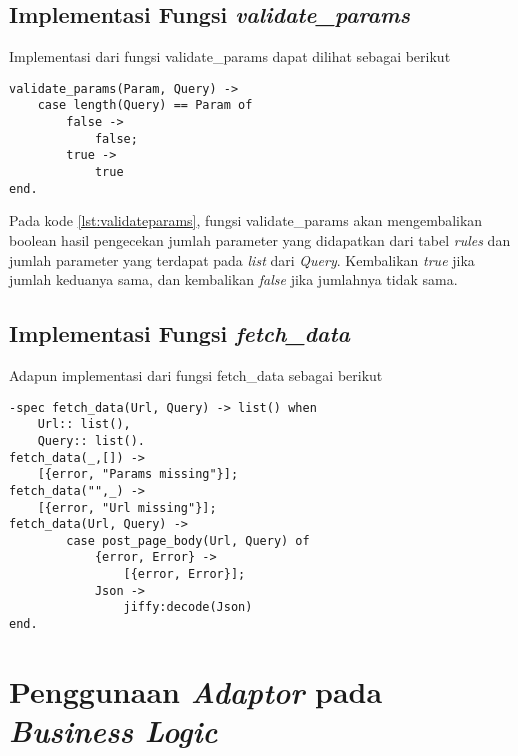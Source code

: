 \subsection{Implementasi Fungsi \textit{validate\_params}}

Implementasi dari fungsi validate\_params dapat dilihat sebagai berikut
\begin{minipage}{\linewidth}
\begin{lstlisting}[caption={Implementasi fungsi validate\_params},label={lst:validateparams}]
validate_params(Param, Query) ->
	case length(Query) == Param of
		false ->
			false;
		true ->
			true
end.
\end{lstlisting}
\end{minipage}

Pada kode \ref{lst:validateparams}, fungsi validate\_params akan mengembalikan boolean hasil pengecekan jumlah parameter yang didapatkan dari tabel \textit{rules} dan jumlah parameter yang terdapat pada \textit{list} dari \textit{Query}. Kembalikan \textit{true} jika jumlah keduanya sama, dan kembalikan \textit{false} jika jumlahnya tidak sama.

\subsection{Implementasi Fungsi \textit{fetch\_data}}

Adapun implementasi dari fungsi fetch\_data sebagai berikut

\begin{minipage}{\linewidth}
\begin{lstlisting}[caption={Implementasi fungsi fetch\_data},label={lst:fetchdata}]
-spec fetch_data(Url, Query) -> list() when
	Url:: list(),
    Query:: list().
fetch_data(_,[]) ->
    [{error, "Params missing"}];
fetch_data("",_) ->
	[{error, "Url missing"}];
fetch_data(Url, Query) ->
	    case post_page_body(Url, Query) of
	        {error, Error} ->
	            [{error, Error}];
	        Json ->     
	            jiffy:decode(Json)
end.
\end{lstlisting}
\end{minipage}

\section{Penggunaan \textit{Adaptor} pada \textit{Business Logic}}

